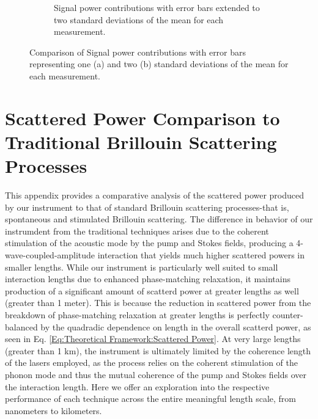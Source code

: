 \begin{figure}[h]
\begin{subfigure}{0.45\textwidth}
    \caption{Signal power contributions with error bars extended to two standard deviations of the mean for each measurement.}
    \label{fig:PSPr-Contribute-Equally-2sigma}
  \end{subfigure}
  \caption{Comparison of Signal power contributions with error bars representing one (a) and two (b) standard deviations of the mean for each measurement.}
  \label{fig:combined}
\end{figure}


\section{Scattered Power Comparison to Traditional Brillouin Scattering Processes}

This appendix provides a comparative analysis of the scattered power produced by our instrument to that of standard Brillouin scattering processes-that is, spontaneous and stimulated Brillouin scattering. The difference in behavior of our instrumdent from the traditional techniques arises due to the coherent stimulation of the acoustic mode by the pump and Stokes fields, producing a 4-wave-coupled-amplitude interaction that yields much higher scattered powers in smaller lengths. While our instrument is particularly well suited to small interaction lengths due to enhanced phase-matching relaxation, it maintains production of a significant amount of scatterd power at greater lengths as well (greater than 1 meter). This is because the reduction in scattered power from the breakdown of phase-matching relaxation at greater lengths is perfectly counter-balanced by the quadradic dependence on length in the overall scatterd power, as seen in Eq. \ref{Eq:Theoretical Framework:Scattered Power}. At very large lengths (greater than 1 km), the instrument is ultimately limited by the coherence length of the lasers employed, as the process relies on the coherent stimulation of the phonon mode and thus the mutual coherence of the pump and Stokes fields over the interaction length. Here we offer an exploration into the respective performance of each technique across the entire meaningful length scale, from nanometers to kilometers.

